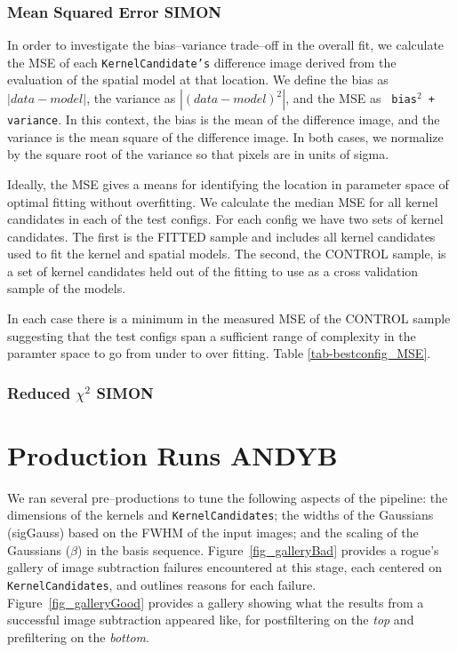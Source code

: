 \documentclass[prd, nofootinbib, floatfix, 11pt,tightenlines,times]{article}
\begin{document}
\subsubsection{Mean Squared Error {\bf SIMON}}

In order to investigate the bias--variance trade--off in the overall
fit, we calculate the MSE of each {\tt KernelCandidate's} difference
image derived from the evaluation of the spatial model at that
location.  We define the bias as $\left| data - model \right|$, the
variance as $\left| (data - model)^2 \right|$, and the MSE as {\tt
  bias$^2$ + variance}.  In this context, the bias is the mean of the
difference image, and the variance is the mean square of the
difference image.  In both cases, we normalize by the square root of
the variance so that pixels are in units of sigma.

Ideally, the MSE gives a means for identifying the location in parameter 
space of optimal fitting without overfitting.  We calculate the median MSE
for all kernel candidates in each of the test configs.  For each config
we have two sets of kernel candidates.  The first is the FITTED sample and
includes all kernel candidates used to fit the kernel and spatial models.  The second,
the CONTROL sample, is a set of kernel candidates held out of the fitting
to use as a cross validation sample of the models.

In each case there is a minimum in the measured MSE of the CONTROL sample suggesting
that the test configs span a sufficient range of complexity in the paramter space to 
go from under to over fitting.  Table \ref{tab-bestconfig_MSE}.

\subsubsection{Reduced $\chi^2$ {\bf SIMON}}


\section{Production Runs {\bf ANDYB}}

We ran several pre--productions to tune the following aspects of the
pipeline: the dimensions of the kernels and {\tt KernelCandidates};
the widths of the Gaussians (sigGauss) based on the FWHM of the input
images; and the scaling of the Gaussians ($\beta$) in the basis
sequence.  Figure~\ref{fig_galleryBad} provides a rogue's gallery of
image subtraction failures encountered at this stage, each centered on
{\tt KernelCandidates}, and outlines reasons for each failure.
Figure~\ref{fig_galleryGood} provides a gallery showing what the
results from a successful image subtraction appeared like, for
postfiltering on the {\it top} and prefiltering on the {\it bottom}.
\end{document}

